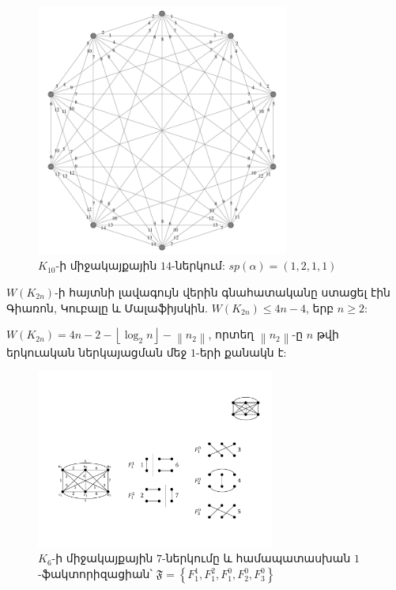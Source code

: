 \begin{hide}
\begin{figure}[b!]
\centering
\includegraphics[width=0.74\textwidth]{figures/K_10-14.pdf}
\caption{$K_{10}$-ի միջակայքային $14$-ներկում: $sp(\alpha) = (1,2,1,1)$}
\label{t2_K10}
\end{figure}
\end{hide}

$W(K_{2n})$-ի հայտնի լավագույն վերին գնահատականը ստացել էին Գիառոն, Կուբալը և Մալաֆիյսկին. 
$W(K_{2n}) \leq 4n-4$, երբ $n \geq 2$:

\begin{hide}
\begin{hypothesis}
\label{h1_complete_log}
$W(K_{2n}) = 4n-2-\left \lfloor \log_2{n} \right \rfloor - \left \| n_2 \right \|$, որտեղ $\left \| n_2 \right \|$-ը $n$ թվի երկուական ներկայացման մեջ $1$-երի քանակն է:
\end{hypothesis}
\end{hide}
\begin{figure}[h]
\centering
\includegraphics[width=0.7\textwidth]{figures/K_6factorization.pdf}
\caption{$K_6$-ի միջակայքային $7$-ներկումը և համապատասխան $1$-ֆակտորիզացիան՝ $\mathfrak{F}=\left\{F_1^1, F_1^2, F_1^0, F_2^0, F_3^0\right\}$}
\label{K_6factorization}
\end{figure}

